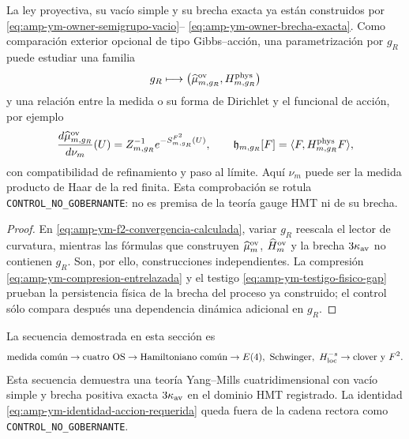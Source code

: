 \begin{proposition}
\label{prop:amp-ym-puente-accion-requerido}
La ley proyectiva, su vacío simple y su brecha exacta ya están construidos
por \eqref{eq:amp-ym-owner-semigrupo-vacio}--
\eqref{eq:amp-ym-owner-brecha-exacta}. Como comparación exterior opcional de
tipo Gibbs--acción, una parametrización por \(g_R\) puede estudiar una familia
\[
 g_R\longmapsto
 \bigl(\widehat\mu_{m,g_R}^{\rm ov},H_{m,g_R}^{\rm phys}\bigr)
\]
y una relación entre la medida o su forma de Dirichlet y el funcional de
acción, por ejemplo
\begin{equation}\label{eq:amp-ym-identidad-accion-requerida}
 \frac{d\widehat\mu_{m,g_R}^{\rm ov}}{d\nu_m}(U)
 =Z_{m,g_R}^{-1}e^{-S_{m,g_R}^{F^2}(U)},
 \qquad
 \mathfrak h_{m,g_R}[F]
 =\langle F,H_{m,g_R}^{\rm phys}F\rangle,
\end{equation}
con compatibilidad de refinamiento y paso al límite. Aquí \(\nu_m\) puede
ser la medida producto de Haar de la red finita. Esta comprobación se rotula
\texttt{CONTROL\_NO\_GOBERNANTE}: no es premisa de la teoría gauge HMT ni
de su brecha.
\end{proposition}

\begin{proof}
En \eqref{eq:amp-ym-f2-convergencia-calculada}, variar \(g_R\) reescala el
lector de curvatura, mientras las fórmulas que construyen
\(\widehat\mu_m^{\rm ov}\), \(\widehat H_m^{\rm ov}\) y la brecha
\(3\kappa_{\rm av}\) no contienen \(g_R\). Son, por ello, construcciones
independientes. La compresión
\eqref{eq:amp-ym-compresion-entrelazada} y el testigo
\eqref{eq:amp-ym-testigo-fisico-gap} prueban la persistencia física de la
brecha del proceso ya construido; el control sólo compara después una
dependencia dinámica adicional en \(g_R\).
\end{proof}

La secuencia demostrada en esta sección es
\[
 \text{medida común}\to\text{cuatro OS}\to\text{Hamiltoniano común}
 \to E(4),\ \text{Schwinger},\ H^{-s}_{\rm loc}
 \to\text{clover y }F^2.
\]
Esta secuencia demuestra una teoría Yang--Mills cuatridimensional con vacío
simple y brecha positiva exacta \(3\kappa_{\rm av}\) en el dominio HMT
registrado. La identidad
\eqref{eq:amp-ym-identidad-accion-requerida} queda fuera de la cadena
rectora como \texttt{CONTROL\_NO\_GOBERNANTE}.

